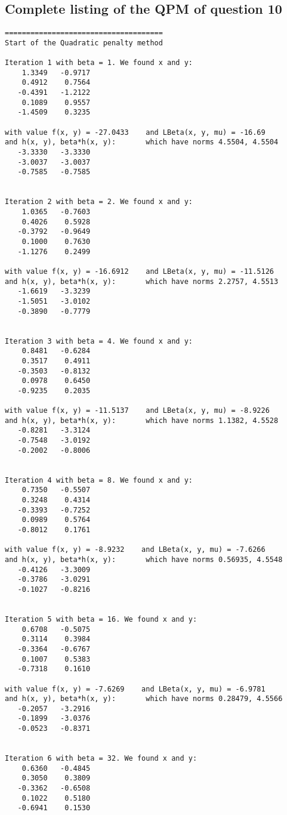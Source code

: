 \documentclass{article}
\begin{document}
\subsection*{Complete listing of the QPM of question 10}
\begin{lstlisting}
=====================================
Start of the Quadratic penalty method

Iteration 1 with beta = 1. We found x and y:
    1.3349   -0.9717
    0.4912    0.7564
   -0.4391   -1.2122
    0.1089    0.9557
   -1.4509    0.3235

with value f(x, y) = -27.0433    and LBeta(x, y, mu) = -16.69
and h(x, y), beta*h(x, y):       which have norms 4.5504, 4.5504
   -3.3330   -3.3330
   -3.0037   -3.0037
   -0.7585   -0.7585


Iteration 2 with beta = 2. We found x and y:
    1.0365   -0.7603
    0.4026    0.5928
   -0.3792   -0.9649
    0.1000    0.7630
   -1.1276    0.2499

with value f(x, y) = -16.6912    and LBeta(x, y, mu) = -11.5126
and h(x, y), beta*h(x, y):       which have norms 2.2757, 4.5513
   -1.6619   -3.3239
   -1.5051   -3.0102
   -0.3890   -0.7779


Iteration 3 with beta = 4. We found x and y:
    0.8481   -0.6284
    0.3517    0.4911
   -0.3503   -0.8132
    0.0978    0.6450
   -0.9235    0.2035

with value f(x, y) = -11.5137    and LBeta(x, y, mu) = -8.9226
and h(x, y), beta*h(x, y):       which have norms 1.1382, 4.5528
   -0.8281   -3.3124
   -0.7548   -3.0192
   -0.2002   -0.8006


Iteration 4 with beta = 8. We found x and y:
    0.7350   -0.5507
    0.3248    0.4314
   -0.3393   -0.7252
    0.0989    0.5764
   -0.8012    0.1761

with value f(x, y) = -8.9232    and LBeta(x, y, mu) = -7.6266
and h(x, y), beta*h(x, y):       which have norms 0.56935, 4.5548
   -0.4126   -3.3009
   -0.3786   -3.0291
   -0.1027   -0.8216


Iteration 5 with beta = 16. We found x and y:
    0.6708   -0.5075
    0.3114    0.3984
   -0.3364   -0.6767
    0.1007    0.5383
   -0.7318    0.1610

with value f(x, y) = -7.6269    and LBeta(x, y, mu) = -6.9781
and h(x, y), beta*h(x, y):       which have norms 0.28479, 4.5566
   -0.2057   -3.2916
   -0.1899   -3.0376
   -0.0523   -0.8371


Iteration 6 with beta = 32. We found x and y:
    0.6360   -0.4845
    0.3050    0.3809
   -0.3362   -0.6508
    0.1022    0.5180
   -0.6941    0.1530


\end{lstlisting}
\end{document}
